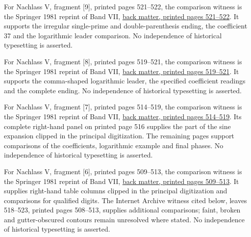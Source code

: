 For Nachlass V, fragment [9], printed pages 521–522, the comparison witness is the Springer 1981 reprint of Band VII, \href{https://link.springer.com/content/pdf/bbm:978-3-642-92478-1/1}{back matter, printed pages 521–522}. It supports the irregular single-prime and double-parenthesis ending, the coefficient 37 and the logarithmic leader comparison. No independence of historical typesetting is asserted.



For Nachlass V, fragment [8], printed pages 519–521, the comparison witness is the Springer 1981 reprint of Band VII, \href{https://link.springer.com/content/pdf/bbm:978-3-642-92478-1/1}{back matter, printed pages 519–521}. It supports the comma-shaped logarithmic leader, the specified coefficient readings and the complete ending. No independence of historical typesetting is asserted.



For Nachlass V, fragment [7], printed pages 514–519, the comparison witness is the Springer 1981 reprint of Band VII, \href{https://link.springer.com/content/pdf/bbm:978-3-642-92478-1/1}{back matter, printed pages 514–519}. Its complete right-hand panel on printed page 516 supplies the part of the sine expansion clipped in the principal digitization. The remaining pages support comparisons of the coefficients, logarithmic example and final phases. No independence of historical typesetting is asserted.



For Nachlass V, fragment [6], printed pages 509–513, the comparison witness is the Springer 1981 reprint of Band VII, \href{https://link.springer.com/content/pdf/bbm:978-3-642-92478-1/1}{back matter, printed pages 509–513}. It supplies right-hand table columns clipped in the principal digitization and comparisons for qualified digits. The Internet Archive witness cited below, leaves 518–523, printed pages 508–513, supplies additional comparisons; faint, broken and gutter-obscured contours remain unresolved where stated. No independence of historical typesetting is asserted.



